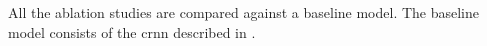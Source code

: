 
All the ablation studies are compared against a baseline
model. The baseline model consists of the \gls{crnn}
described in .
